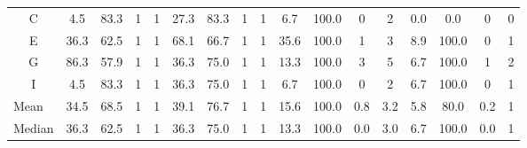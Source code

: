 \begin{landscape}
\begin{table}[p]
\begin{tabular}{@{}ccccccccccccccccc@{}}
      \multicolumn{1}{c|}{C}              & 4.5  & 83.3 & 1    & \multicolumn{1}{c|}{1}    & 27.3                     & 83.3                     & 1                        & \multicolumn{1}{c|}{1}    & 6.7  & 100.0                    & 0                        & \multicolumn{1}{c|}{2}    & 0.0                      & 0.0                      & 0                        & 0                        \\
      \multicolumn{1}{c|}{E}              & 36.3 & 62.5 & 1    & \multicolumn{1}{c|}{1}    & 68.1                     & 66.7                     & 1                        & \multicolumn{1}{c|}{1}    & 35.6 & 100.0                    & 1                        & \multicolumn{1}{c|}{3}    & 8.9                      & 100.0                    & 0                        & 1                        \\
      \multicolumn{1}{c|}{G}              & 86.3 & 57.9 & 1    & \multicolumn{1}{c|}{1}    & 36.3                     & 75.0                     & 1                        & \multicolumn{1}{c|}{1}    & 13.3 & 100.0                    & 3                        & \multicolumn{1}{c|}{5}    & 6.7                      & 100.0                    & 1                        & 2                        \\
      \multicolumn{1}{c|}{I}              & 4.5  & 83.3 & 1    & \multicolumn{1}{c|}{1}    & 36.3                     & 75.0                     & 1                        & \multicolumn{1}{c|}{1}    & 6.7  & 100.0                    & 0                        & \multicolumn{1}{c|}{2}    & 6.7                      & 100.0                    & 0                        & 1                        \\ \midrule
      \multicolumn{1}{l|}{Mean}           & 34.5 & 68.5 & 1    & \multicolumn{1}{c|}{1}    & 39.1                     & 76.7                     & 1                        & \multicolumn{1}{c|}{1}    & 15.6 & 100.0                    & 0.8                      & \multicolumn{1}{c|}{3.2}  & 5.8                      & 80.0                     & 0.2                      & 1                        \\
      \multicolumn{1}{l|}{Median}         & 36.3 & 62.5 & 1    & \multicolumn{1}{c|}{1}    & 36.3                     & 75.0                     & 1                        & \multicolumn{1}{c|}{1}    & 13.3 & 100.0                    & 0.0                      & \multicolumn{1}{c|}{3.0}  & 6.7                      & 100.0                    & 0.0                      & 1                        \\ \bottomrule
    \end{tabular}
    \label{tab:Results-Quantitative-AB}
  \end{table}
\end{landscape}

